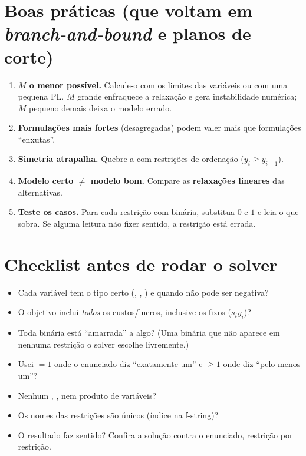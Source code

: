 \section*{Boas práticas (que voltam em \emph{branch-and-bound} e planos de corte)}
\begin{enumerate}
  \item \textbf{$M$ o menor possível.} Calcule-o com os limites das variáveis ou com uma pequena PL. $M$ grande
  enfraquece a relaxação e gera instabilidade numérica; $M$ pequeno demais deixa o modelo errado.
  \item \textbf{Formulações mais fortes} (desagregadas) podem valer mais que formulações ``enxutas''.
  \item \textbf{Simetria atrapalha.} Quebre-a com restrições de ordenação ($y_i\ge y_{i+1}$).
  \item \textbf{Modelo certo $\neq$ modelo bom.} Compare as \textbf{relaxações lineares} das alternativas.
  \item \textbf{Teste os casos.} Para cada restrição com binária, substitua $0$ e $1$ e leia o que sobra. Se
  alguma leitura não fizer sentido, a restrição está errada.
\end{enumerate}

\section*{Checklist antes de rodar o solver}
\begin{itemize}
  \item[$\square$] Cada variável tem o tipo certo (, , ) e  quando
  não pode ser negativa?
  \item[$\square$] O objetivo inclui \emph{todos} os custos/lucros, inclusive os fixos ($s_iy_i$)?
  \item[$\square$] Toda binária está ``amarrada'' a algo? (Uma binária que não aparece em nenhuma restrição o solver
  escolhe livremente.)
  \item[$\square$] Usei $=1$ onde o enunciado diz ``exatamente um'' e $\ge1$ onde diz ``pelo menos um''?
  \item[$\square$] Nenhum \py{<}, \py{>}, \py{!=} nem produto de variáveis?
  \item[$\square$] Os nomes das restrições são únicos (índice na f-string)?
  \item[$\square$] O resultado faz sentido? Confira a solução contra o enunciado, restrição por restrição.
\end{itemize}

